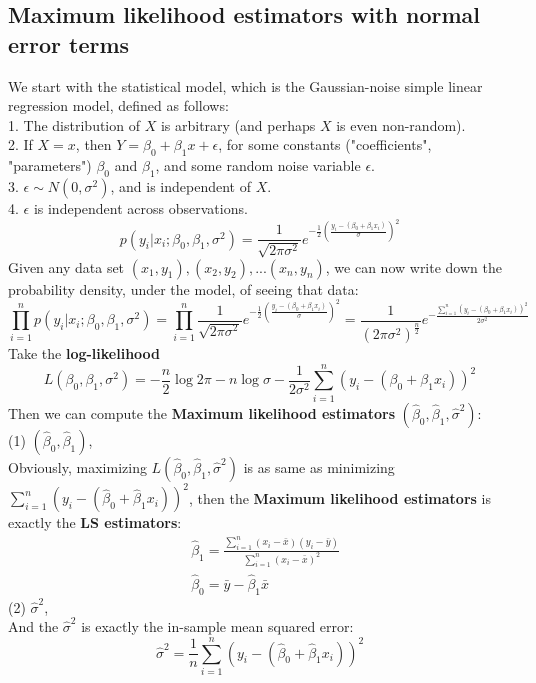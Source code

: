\documentclass[11pt,a4paper]{article}
\begin{document}
\subsection{Maximum likelihood estimators with normal error terms}
We start with the statistical model, which is the Gaussian-noise simple linear regression model, defined as follows:\\
1. The distribution of $X$ is arbitrary (and perhaps $X$ is even non-random).\\
2. If $X=x$, then $Y=\beta_{0}+\beta_{1} x+\epsilon$, for some constants ("coefficients", "parameters") $\beta_{0}$ and $\beta_{1}$, and some random noise variable $\epsilon$.\\
3. $\epsilon \sim N\left(0, \sigma^{2}\right)$, and is independent of $X$.\\
4. $\epsilon$ is independent across observations.\\
$$p(y_i|x_i; \beta_0,\beta_1,\sigma^2)=\frac{1}{\sqrt{2\pi\sigma^2}}e^{-\frac{1}{2}(\frac{y_i-(\beta_0+\beta_1x_i)}{\sigma})^2}$$
Given any data set $(x_1, y_1), (x_2, y_2), . . . (x_n, y_n)$, we can now write down the probability density, under the model, of seeing that data:
$$\prod_{i=1}^n p(y_i|x_i; \beta_0,\beta_1,\sigma^2)=\prod_{i=1}^n\frac{1}{\sqrt{2\pi\sigma^2}}e^{-\frac{1}{2}(\frac{y_i-(\beta_0+\beta_1x_i)}{\sigma})^2}=\frac{1}{(2\pi\sigma^2)^{\frac{n}{2}}}e^{-\frac{\sum_{i=1}^n(y_i-(\beta_0+\beta_1x_i))^2}{2\sigma^2}}$$
Take the \textbf{log-likelihood}
$$L(\beta_0,\beta_1,\sigma^2)=-\frac{n}{2}\log{2\pi}-n\log{\sigma}-\frac{1}{2\sigma^2}\sum_{i=1}^n(y_i-(\beta_0+\beta_1x_i))^2$$
Then we can compute the \textbf{Maximum likelihood estimators} $(\hat{\beta}_0,\hat{\beta}_1,\hat{\sigma}^2)$:\\
(1) $(\hat{\beta}_0,\hat{\beta}_1)$,\\
Obviously, maximizing $L(\hat{\beta}_0,\hat{\beta}_1,\hat{\sigma}^2)$ is as same as minimizing $\sum_{i=1}^n(y_i-(\hat{\beta}_0+\hat{\beta}_1x_i))^2$, then the \textbf{Maximum likelihood estimators} is exactly the \textbf{LS estimators}:
$$\begin{aligned}
    &\hat{\beta}_{1}=\frac{\sum_{i=1}^{n}\left(x_{i}-\bar{x}\right)\left(y_{i}-\bar{y}\right)}{\sum_{i=1}^{n}\left(x_{i}-\bar{x}\right)^{2}} \\
    &\hat{\beta}_{0}=\bar{y}-\hat{\beta}_{1} \bar{x}
\end{aligned}$$
(2) $\hat{\sigma}^2$,\\
And the $\hat{\sigma}^2$ is exactly the in-sample mean squared error:
$$\hat{\sigma}^2=\frac{1}{n}\sum_{i=1}^n(y_i-(\hat{\beta}_0+\hat{\beta}_1x_i))^2$$
\end{document}
